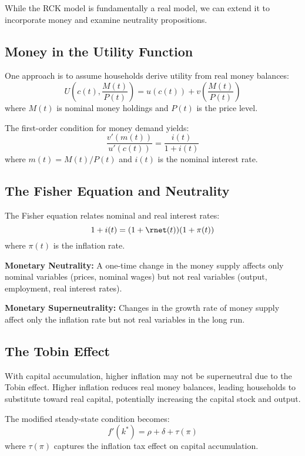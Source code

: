 \documentclass[\topdir/lecture\_notes.tex]{subfiles}
\begin{document}
While the RCK model is fundamentally a real model, we can extend it to incorporate money and examine neutrality propositions.

\subsection{Money in the Utility Function}

One approach is to assume households derive utility from real money balances:
\begin{equation}
U\left(c(t), \frac{M(t)}{P(t)}\right) = u(c(t)) + v\left(\frac{M(t)}{P(t)}\right)
\end{equation}
where $M(t)$ is nominal money holdings and $P(t)$ is the price level.

The first-order condition for money demand yields:
\begin{equation}
\frac{v'(m(t))}{u'(c(t))} = \frac{i(t)}{1+i(t)}
\end{equation}
where $m(t) = M(t)/P(t)$ and $i(t)$ is the nominal interest rate.

\subsection{The Fisher Equation and Neutrality}

The Fisher equation relates nominal and real interest rates:
\begin{equation}
1 + i(t) = (1 + \rnet(t))(1 + \pi(t))
\end{equation}
where $\pi(t)$ is the inflation rate.

\textbf{Monetary Neutrality:} A one-time change in the money supply affects only nominal variables (prices, nominal wages) but not real variables (output, employment, real interest rates).

\textbf{Monetary Superneutrality:} Changes in the growth rate of money supply affect only the inflation rate but not real variables in the long run.

\subsection{The Tobin Effect}

With capital accumulation, higher inflation may not be superneutral due to the Tobin effect. Higher inflation reduces real money balances, leading households to substitute toward real capital, potentially increasing the capital stock and output.

The modified steady-state condition becomes:
\begin{equation}
f'(k^*) = \rho + \delta + \tau(\pi)
\end{equation}
where $\tau(\pi)$ captures the inflation tax effect on capital accumulation.
\end{document}
